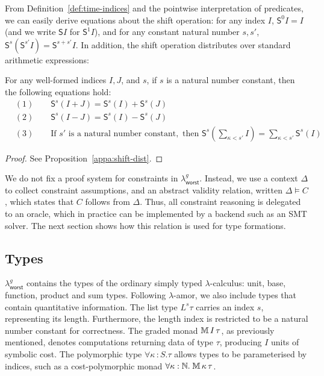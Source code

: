 From Definition~\ref{def:time-indices} and the pointwise interpretation of predicates, we can easily derive equations about the shift operation: for any index $I$, $\mathsf{S}^0 I= I$ (and we write $\mathsf{S}I$ for $\mathsf{S}^1 I$), 
and for any constant natural number $s, s'$, $\mathsf{S}^{s}(\mathsf{S}^{s'}I) = \mathsf{S}^{s+s'}I$.
In addition, the shift operation distributes over standard arithmetic expressions:
\begin{prop}
\label{lem:shif-dist}
For any well-formed indices $I, J$, and $s$, if $ s$ is a natural number constant, then the following equations hold:
\begin{align*}
  &(1) \qquad \mathsf{S}^s(I+J)
  = \mathsf{S}^s(I)+\mathsf{S}^s(J)\\
  &(2)\qquad \mathsf{S}^s(I-J)
  = \mathsf{S}^s(I)-\mathsf{S}^s(J)\\
  &(3)\qquad \text{If } s' \text{ is a natural number constant}, \text{ then }\mathsf{S}^s\left(\textstyle\sum_{\kappa<s'}I\right)
  = \textstyle\sum_{\kappa<s'}\mathsf{S}^s(I)
\end{align*}
\end{prop}
\begin{proof}
  See Proposition~\ref{appa:shift-dist}.
\end{proof}

We do not fix a proof system for constraints in $\lambda^g_{\mathsf{worst}}$. Instead, we use a context $\Delta$ to collect constraint assumptions, and an abstract validity relation, written $\Delta \models C$, which states that $C$ follows from $\Delta$. 
Thus, all constraint reasoning is delegated to an oracle, which in practice can be implemented by a backend such as an SMT solver. 
The next section shows how this relation is used for type formations.

\subsection{Types}
$\lambda^g_{\mathsf{worst}}$ contains the types of the ordinary simply typed $\lambda$-calculus: unit, base, function,
product and sum types. Following $\lambda$-amor, we also include types that contain quantitative information.
The list type $L^s \tau$ carries an index $s$, representing its length. Furthermore, the length index is
restricted to be a natural number constant for correctness. The graded monad $\mathbb{M}\,{I}\, \tau$, as previously mentioned, denotes computations returning data of type $\tau$, producing $I$ units of symbolic cost.
The polymorphic type $\forall\kappa\,{:}S.\tau$ allows types to be parameterised by indices, such as a cost-polymorphic monad
$\forall \kappa:\mathbb{N}.\;\mathbb{M}\,{\kappa}\, \tau$.

